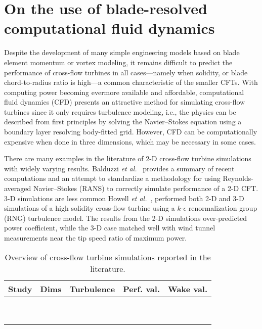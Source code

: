 \chapter{On the use of blade-resolved computational fluid
    dynamics}\label{chap:CFD}

Despite the development of many simple engineering models based on blade element
momentum or vortex modeling, it remains difficult to predict the performance of
cross-flow turbines in all cases---namely when solidity, or blade
chord-to-radius ratio is high---a common characteristic of the smaller CFTs.
With computing power becoming evermore available and affordable, computational
fluid dynamics (CFD) presents an attractive method for simulating cross-flow
turbines since it only requires turbulence modeling, i.e., the physics can be
described from first principles by solving the Navier--Stokes equation using a
boundary layer resolving body-fitted grid. However, CFD can be computationally
expensive when done in three dimensions, which may be necessary in some cases.

There are many examples in the literature of 2-D cross-flow turbine simulations
with widely varying results. Balduzzi \emph{et al.}~\cite{Balduzzi2016} provides
a summary of recent computations and an attempt to standardize a methodology for
using Reynolds-averaged Navier--Stokes (RANS) to correctly simulate performance
of a 2-D CFT. 3-D simulations are less common  Howell \emph{et al.}~\cite{Howell2010}, performed both
2-D and 3-D simulations of a high solidity cross-flow turbine using a
$k$-$\epsilon$ renormalization group (RNG) turbulence model. The results from
the 2-D simulations over-predicted power coefficient, while the 3-D case matched
well with wind tunnel measurements near the tip speed ratio of maximum power.

\begin{table}
    \centering
    \begin{tabular}{c|c|c|c|c}
        Study & Dims & Turbulence & Perf. val. & Wake val. \\ 
        \hline
        &  &  &  &  \\ 
        &  &  &  &  \\ 
        &  &  &  &  \\ 
        &  &  &  &  \\ 
        &  &  &  &  \\ 
        &  &  &  &  \\ 
        &  &  &  &  \\ 
        &  &  &  &  \\ 
        &  &  &  & 
    \end{tabular}
    
    \caption{Overview of cross-flow turbine simulations reported in the literature.}
    
    \label{tab:cfd-refs}
\end{table}


